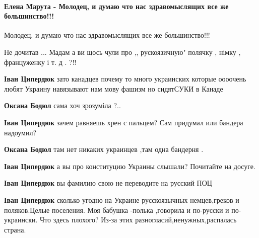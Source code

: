  
 
 
 
 
\paragraph{Елена Марута - Молодец, и думаю что нас здравомыслящих все же большинство!!!}

\begin{itemize}
Молодец, и думаю что нас здравомыслящих все же большинство!!!

Не дочитав ... Мадам а ви щось чули про ,, рускоязичную" полячку , німку , француженку і т. д . ?!!

\begin{itemize}
\textbf{Іван Ципердюк} зато канадцев почему то много украинских которые оооочень любят Украину навязывают нам мову фашизм но сидятСУКИ в Канаде

\textbf{Оксана Бодюл} сама хоч зрозуміла ?..

\textbf{Іван Ципердюк} зачем равняешь хрен с пальцем? Сам придумал или бандера надоумил?

\textbf{Оксана Бодюл} там нет никаких украинцев ,там одна бандерня .

\textbf{Іван Ципердюк} а вы про конституцию Украины слышали? Почитайте на досуге.

\textbf{Іван Ципердюк} вы фамилию свою не переводите на русский ПОЦ

\textbf{Іван Ципердюк} сколько угодно на Украине русскоязычных немцев,греков и поляков.Целые поселения. Моя бабушка -полька ,говорила и по-русски и по-украински. Что здесь плохого?
Из-за этих разногласий,ненужных,распалась страна.


\end{itemize}
\end{itemize}
